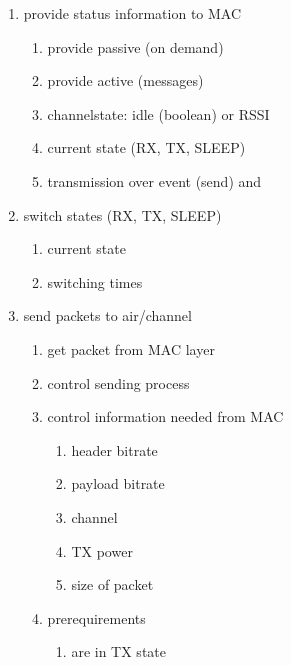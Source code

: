\begin{enumerate}
 \item provide status information to MAC
	\begin{enumerate}
	\item provide passive (on demand) \label{provpassive}
	\item provide active (messages) \label{provactive}
	\item channelstate: idle (boolean) or RSSI \label{channelstate}
	\item current state (RX, TX, SLEEP) \label{currentmode}
	\item transmission over event (send)  and \label{txover}
	\end{enumerate}
 \item switch states (RX, TX, SLEEP)
	\begin{enumerate}
	\item current state \label{switchmode}
	\item switching times \label{switchtimes}
	\end{enumerate}
 \item send packets to air/channel
	\begin{enumerate}
	\item get packet from MAC layer \label{packetFromMac}
	\item control sending process \label{sendControl}
	\item control information needed from MAC
		\begin{enumerate}
		\item header bitrate \label{sendCtrlHeaderBitrate}
		\item payload bitrate \label{sendCtrlBitrate}
		\item channel \label{sendCtrlChannel}
		\item TX power \label{sendCtrlTXPower}
		\item size of packet \label{sendCtrlSize}
		\end{enumerate}
	\item prerequirements
		\begin{enumerate}
		\item are in TX state \label{sendPreqMode}

\end{enumerate}
\end{enumerate}
\end{enumerate}
